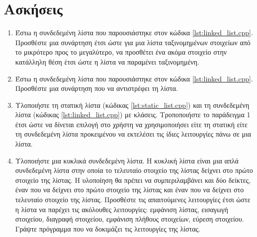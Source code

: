 \section{Ασκήσεις}
\begin{enumerate}[nolistsep]
\item Έστω η συνδεδεμένη λίστα που παρουσιάστηκε στον κώδικα \ref{lst:linked_list.cpp}. Προσθέστε μια συνάρτηση έτσι ώστε για  μια λίστα ταξινομημένων στοιχείων από το μικρότερο προς το μεγαλύτερο, να προσθέτει ένα ακόμα στοιχείο στην κατάλληλη θέση έτσι ώστε η λίστα να παραμένει ταξινομημένη.
\item Έστω η συνδεδεμένη λίστα που παρουσιάστηκε στον κώδικα \ref{lst:linked_list.cpp}. Προσθέστε μια συνάρτηση που να αντιστρέφει τη λίστα.
\item Υλοποιήστε τη στατική λίστα (κώδικας \ref{lst:static_list.cpp}) και τη συνδεδεμένη λίστα (κώδικας \ref{lst:linked_list.cpp}) με κλάσεις. Τροποποιήστε το παράδειγμα 1 έτσι ώστε να δίνεται επιλογή στο χρήστη να χρησιμοποιήσει είτε τη στατική είτε τη συνδεδεμένη λίστα προκειμένου να εκτελέσει τις ίδιες λειτουργίες πάνω σε μια λίστα. 
\item Υλοποιήστε μια κυκλικά συνδεδεμένη λίστα. Η κυκλική λίστα είναι μια απλά συνδεδεμένη λίστα στην οποία το τελευταίο στοιχείο της λίστας δείχνει στο πρώτο στοιχείο της λίστας. Η υλοποίηση θα πρέπει να συμπεριλαμβάνει και δύο δείκτες, έναν που να δείχνει στο πρώτο στοιχείο της λίστας και έναν που να δείχνει στο τελευταίο στοιχείο της λίστας. Προσθέστε τις απαιτούμενες λειτουργίες έτσι ώστε η λίστα να παρέχει τις ακόλουθες λειτουργίες: εμφάνιση λίστας, εισαγωγή στοιχείου, διαγραφή στοιχείου, εμφάνιση πλήθους στοιχείων, εύρεση στοιχείου. Γράψτε πρόγραμμα που να δοκιμάζει τις λειτουργίες της λίστας.
\end{enumerate}

